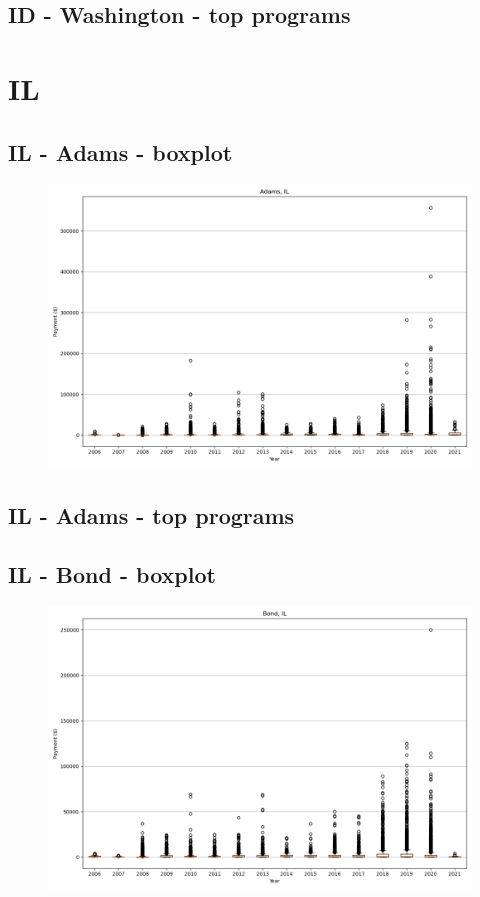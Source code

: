 \subsection*{ID - Washington - top programs}

\newpage
\section*{IL}
\subsection*{IL - Adams - boxplot}
\begin{figure}[h]
\centering
\includegraphics[width=7in]{../output/boxplots/counties/Adams-IL_boxplot.png}
\end{figure}


\subsection*{IL - Adams - top programs}

\newpage
\subsection*{IL - Bond - boxplot}
\begin{figure}[h]
\centering
\includegraphics[width=7in]{../output/boxplots/counties/Bond-IL_boxplot.png}
\end{figure}


